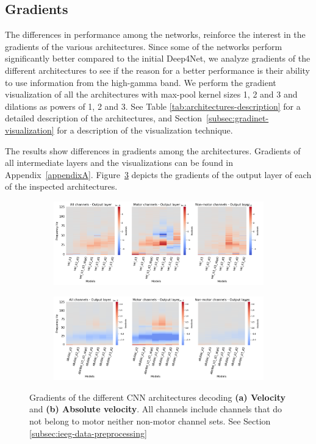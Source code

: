 \subsection{Gradients}\label{subsec:gradients}
The differences in performance among the networks, reinforce the interest in the gradients of the various architectures.
Since some of the networks perform significantly better compared to the initial Deep4Net, we analyze gradients of the different architectures to see if the reason for a better performance is their ability to use information from the high-gamma band.
We perform the gradient visualization of all the architectures with max-pool kernel sizes 1, 2 and 3 and dilations as powers of 1, 2 and 3. See Table \ref{tab:architectures-description} for a detailed description of the architectures, and Section~\ref{subsec:gradinet-visualization} for a description of the visualization technique.

The results show differences in gradients among the architectures.
Gradients of all intermediate layers and the visualizations can be found in Appendix~\ref{appendixA}.
Figure~\ref{fig:last-layer-grads} depicts the gradients of the output layer of each of the inspected architectures.

\begin{figure}[!htpb]
\centering
\begin{subfigure}[b]{\textwidth}
   \includegraphics[width=1\linewidth]{img/ch4/vel-last-layer-grads}
   \caption{}
   \label{fig:absVel-last-layer-grads}
\end{subfigure}

\begin{subfigure}[b]{\textwidth}
   \includegraphics[width=1\linewidth]{img/ch4/absVel-last-layer-grads}
   \caption{}
   \label{fig:vel-last-layer-grads}
\end{subfigure}
\caption[Non-shifted causal prediction - gradients]{Gradients of the different CNN architectures decoding \textbf{(a) Velocity} and \textbf{(b) Absolute velocity}. All channels include channels that do not belong to motor neither non-motor channel sets. See Section \ref{subsec:ieeg-data-preprocessing}}
\label{fig:last-layer-grads}
\end{figure}

